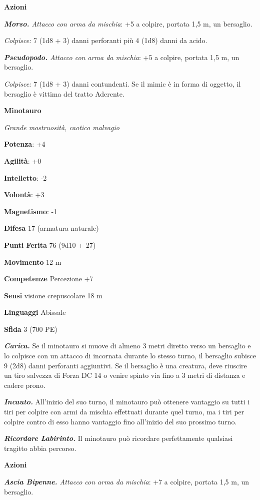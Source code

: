 \begin{multicols}{2}
\textbf{Azioni}

\emph{\textbf{Morso.} Attacco con arma da mischia}: +5 a colpire,
portata 1,5 m, un bersaglio.

\emph{Colpisce:} 7 (1d8 + 3) danni perforanti più 4 (1d8) danni da
acido.

\emph{\textbf{Pseudopodo.} Attacco con arma da mischia}: +5 a colpire,
portata 1,5 m, un bersaglio.

\emph{Colpisce:} 7 (1d8 + 3) danni contundenti. Se il mimic è in forma
di oggetto, il bersaglio è vittima del tratto Aderente.



\textbf{Minotauro}

\emph{Grande mostruosità, caotico malvagio}

\textbf{Potenza}: +4

\textbf{Agilità}: +0

\textbf{Intelletto}: -2

\textbf{Volontà}: +3

\textbf{Magnetismo}: -1

\textbf{Difesa} 17 (armatura naturale)

\textbf{Punti Ferita} 76 (9d10 + 27)

\textbf{Movimento} 12 m

\textbf{Competenze} Percezione +7

\textbf{Sensi} visione crepuscolare 18 m

\textbf{Linguaggi} Abissale

\textbf{Sfida} 3 (700 PE)

\emph{\textbf{Carica.}} Se il minotauro si muove di almeno 3 metri
diretto verso un bersaglio e lo colpisce con un attacco di incornata
durante lo stesso turno, il bersaglio subisce 9 (2d8) danni perforanti
aggiuntivi. Se il bersaglio è una creatura, deve riuscire un tiro
salvezza di Forza DC 14 o venire spinto via fino a 3 metri di distanza e
cadere prono.

\emph{\textbf{Incauto.}} All'inizio del suo turno, il minotauro può
ottenere vantaggio su tutti i tiri per colpire con armi da mischia
effettuati durante quel turno, ma i tiri per colpire contro di esso
hanno vantaggio fino all'inizio del suo prossimo turno.

\emph{\textbf{Ricordare Labirinto.}} Il minotauro può ricordare
perfettamente qualsiasi tragitto abbia percorso.

\textbf{Azioni}

\emph{\textbf{Ascia Bipenne.} Attacco con arma da mischia}: +7 a
colpire, portata 1,5 m, un bersaglio.


\end{multicols}
